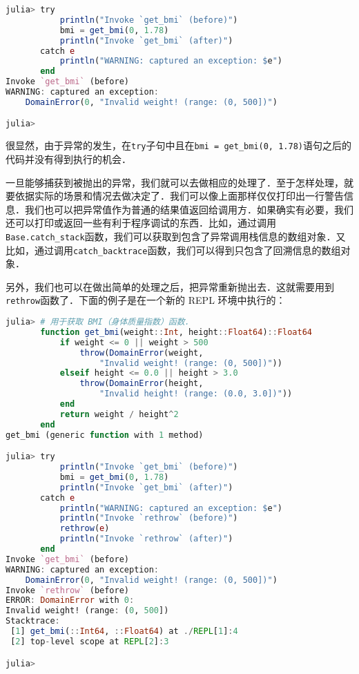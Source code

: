 \begin{lstlisting}[language=julia]
julia> try 
           println("Invoke `get_bmi` (before)")
           bmi = get_bmi(0, 1.78)
           println("Invoke `get_bmi` (after)")
       catch e
           println("WARNING: captured an exception: $e")
       end
Invoke `get_bmi` (before)
WARNING: captured an exception: 
    DomainError(0, "Invalid weight! (range: (0, 500])")

julia> 
\end{lstlisting}

很显然，由于异常的发生，在\verb|try|子句中且在\verb|bmi = get_bmi(0, 1.78)|语句之后的代码并没有得到执行的机会．

一旦能够捕获到被抛出的异常，我们就可以去做相应的处理了．至于怎样处理，就要依据实际的场景和情况去做决定了．我们可以像上面那样仅仅打印出一行警告信息．我们也可以把异常值作为普通的结果值返回给调用方．如果确实有必要，我们还可以打印或返回一些有利于程序调试的东西．比如，通过调用\verb|Base.catch_stack|函数，我们可以获取到包含了异常调用栈信息的数组对象．又比如，通过调用\verb|catch_backtrace|函数，我们可以得到只包含了回溯信息的数组对象．

另外，我们也可以在做出简单的处理之后，把异常重新抛出去．这就需要用到\verb|rethrow|函数了．下面的例子是在一个新的 REPL 环境中执行的：

\begin{lstlisting}[language=julia]
julia> # 用于获取 BMI（身体质量指数）函数．
       function get_bmi(weight::Int, height::Float64)::Float64
           if weight <= 0 || weight > 500
               throw(DomainError(weight, 
                   "Invalid weight! (range: (0, 500])"))
           elseif height <= 0.0 || height > 3.0
               throw(DomainError(height, 
                   "Invalid height! (range: (0.0, 3.0])"))
           end
           return weight / height^2
       end
get_bmi (generic function with 1 method)

julia> try 
           println("Invoke `get_bmi` (before)")
           bmi = get_bmi(0, 1.78)
           println("Invoke `get_bmi` (after)")
       catch e
           println("WARNING: captured an exception: $e")
           println("Invoke `rethrow` (before)")
           rethrow(e)
           println("Invoke `rethrow` (after)")
       end
Invoke `get_bmi` (before)
WARNING: captured an exception: 
    DomainError(0, "Invalid weight! (range: (0, 500])")
Invoke `rethrow` (before)
ERROR: DomainError with 0:
Invalid weight! (range: (0, 500])
Stacktrace:
 [1] get_bmi(::Int64, ::Float64) at ./REPL[1]:4
 [2] top-level scope at REPL[2]:3

julia> 
\end{lstlisting}

